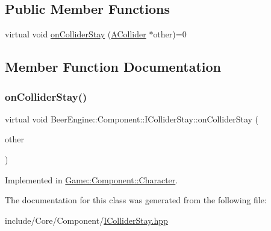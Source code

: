 \subsection*{Public Member Functions}
\begin{DoxyCompactItemize}
\item 
virtual void \mbox{\hyperlink{class_beer_engine_1_1_component_1_1_i_collider_stay_a462a0eb147235000265ed3f29d8b343e}{on\+Collider\+Stay}} (\mbox{\hyperlink{class_beer_engine_1_1_component_1_1_a_collider}{A\+Collider}} $\ast$other)=0
\end{DoxyCompactItemize}


\subsection{Member Function Documentation}
\mbox{\label{class_beer_engine_1_1_component_1_1_i_collider_stay_a462a0eb147235000265ed3f29d8b343e}} 
\subsubsection{\texorpdfstring{on\+Collider\+Stay()}{onColliderStay()}}
{\footnotesize\ttfamily virtual void Beer\+Engine\+::\+Component\+::\+I\+Collider\+Stay\+::on\+Collider\+Stay (\begin{DoxyParamCaption}\item[{\mbox{\hyperlink{class_beer_engine_1_1_component_1_1_a_collider}{A\+Collider}} $\ast$}]{other }\end{DoxyParamCaption})\hspace{0.3cm}{\ttfamily [pure virtual]}}



Implemented in \mbox{\hyperlink{class_game_1_1_component_1_1_character_afdb1ebc07baa1a95840af9dfb48d9348}{Game\+::\+Component\+::\+Character}}.



The documentation for this class was generated from the following file\+:\begin{DoxyCompactItemize}
\item 
include/\+Core/\+Component/\mbox{\hyperlink{_i_collider_stay_8hpp}{I\+Collider\+Stay.\+hpp}}\end{DoxyCompactItemize}
